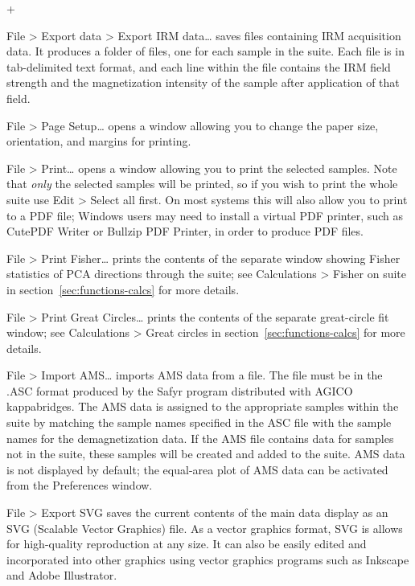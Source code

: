 \documentclass[a4paper,british]{article}
\newcommand{\menuitemlabel}[1]{%
\mbox{\textsf{#1}}\hfil}
\newenvironment{menuitemlist}%
{\begin{list}{}{%
\renewcommand{\makelabel}{\menuitemlabel}%
\setlength{\labelwidth}{35pt}%
\setlength{\leftmargin}%
             {\labelwidth+\labelsep}}}%
{\end{list}}
\newcommand{\ppcmd}[1]{\textsf{#1}} %
\newcommand{\caps}[1]{\MakeTextUppercase{#1}} %
\newcommand{\submenu}{ \textgreater{} } %
\begin{document}
\begin{menuitemlist}
\item[File\submenu Export data\submenu Export IRM data\ldots] saves files
  containing \caps{irm} acquisition data. It produces a folder of files, one
  for each sample in the suite. Each file is in tab-delimited text format,
  and each line within the file contains the \caps{irm} field strength and
  the magnetization intensity of the sample after application of that field.

\item[File\submenu Page Setup\ldots] opens a window allowing you
to change the paper size, orientation, and margins for printing.

\item[File\submenu Print\ldots] opens a window allowing you to print the
selected samples. Note that {\em only} the selected samples will be printed,
so if you wish to print the whole suite use \ppcmd{Edit\submenu Select all} first.
On most systems this will also allow you to print to a \caps{pdf} file;
Windows users may need to install a virtual \caps{pdf} printer, such as
Cute\caps{pdf} Writer or Bullzip \caps{pdf} Printer, in order to produce
\caps{pdf} files.

\item[File\submenu Print Fisher\ldots] prints the contents of the separate
window showing Fisher statistics of \caps{pca} directions through the suite;
see \ppcmd{Calculations\submenu Fisher on suite} in
section~\ref{sec:functions-calcs} for more details.

\item[File\submenu Print Great Circles\ldots] prints the contents of the
  separate great-circle fit window; see \ppcmd{Calculations\submenu Great
    circles} in section~\ref{sec:functions-calcs} for more details.

\item[File\submenu Import AMS\ldots] imports \caps{ams} data from a file. The
  file must be in the \caps{.asc} format produced by the \ppcmd{Safyr}
  program distributed with \caps{Agico} kappabridges. The \caps{ams} data is
  assigned to the appropriate samples within the suite by matching the sample
  names specified in the \caps{asc} file with the sample names for the
  demagnetization data. If the \caps{ams} file contains data for samples not
  in the suite, these samples will be created and added to the suite.
  \caps{Ams} data is not displayed by default; the equal-area plot of
  \caps{ams} data can be activated from the \ppcmd{Preferences} window.

\item[File\submenu Export SVG] saves the current contents of the main
data display as an \caps{svg} (Scalable Vector Graphics) file. As a vector
graphics format, \caps{svg} is allows for high-quality reproduction at any
size. It can also be easily edited and incorporated into other graphics using
vector graphics programs such as Inkscape and Adobe Illustrator.


\end{menuitemlist}
\end{document}
